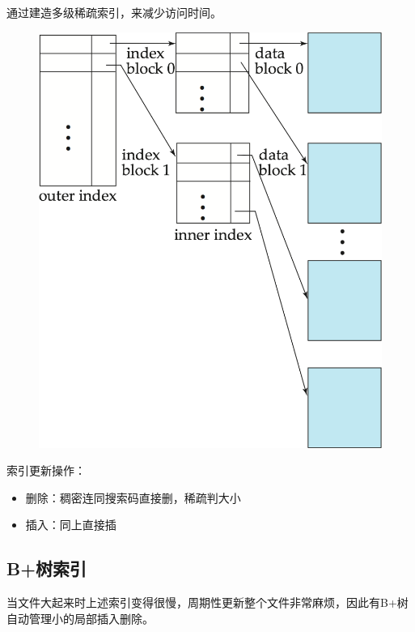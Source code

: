 通过建造多级稀疏索引，来减少访问时间。
\begin{figure}[H]
\centering
\includegraphics[width=0.4\linewidth]{fig/multilevel-index.png}
\end{figure}

索引更新操作：
\begin{itemize}
	\item 删除：稠密连同搜索码直接删，稀疏判大小
	\item 插入：同上直接插
\end{itemize}

\subsection{B+树索引}
当文件大起来时上述索引变得很慢，周期性更新整个文件非常麻烦，因此有B+树自动管理小的局部插入删除。


